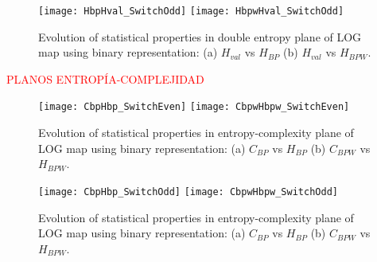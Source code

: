 \begin{figure}
	\texttt{[image: HbpHval\_SwitchOdd]}
	\texttt{[image: HbpwHval\_SwitchOdd]}
	\caption{Evolution of statistical properties in double entropy plane of LOG map using binary representation: (a) $H_{val}$ vs $H_{BP}$ (b) $H_{val}$ vs $H_{BPW}$.}
	\label{fig:ODD_HH}
\end{figure}

\textcolor{red}{PLANOS ENTROPÍA-COMPLEJIDAD}

\begin{figure}
	\texttt{[image: CbpHbp\_SwitchEven]}
	\texttt{[image: CbpwHbpw\_SwitchEven]}
	\caption{Evolution of statistical properties in entropy-complexity plane of LOG map using binary representation: (a) $C_{BP}$ vs $H_{BP}$ (b) $C_{BPW}$ vs $H_{BPW}$.}
	\label{fig:EVEN_HC}
\end{figure}

\begin{figure}
	\texttt{[image: CbpHbp\_SwitchOdd]}
	\texttt{[image: CbpwHbpw\_SwitchOdd]}
	\caption{Evolution of statistical properties in entropy-complexity plane of LOG map using binary representation: (a) $C_{BP}$ vs $H_{BP}$ (b) $C_{BPW}$ vs $H_{BPW}$.}
	\label{fig:ODD_HC}
\end{figure}